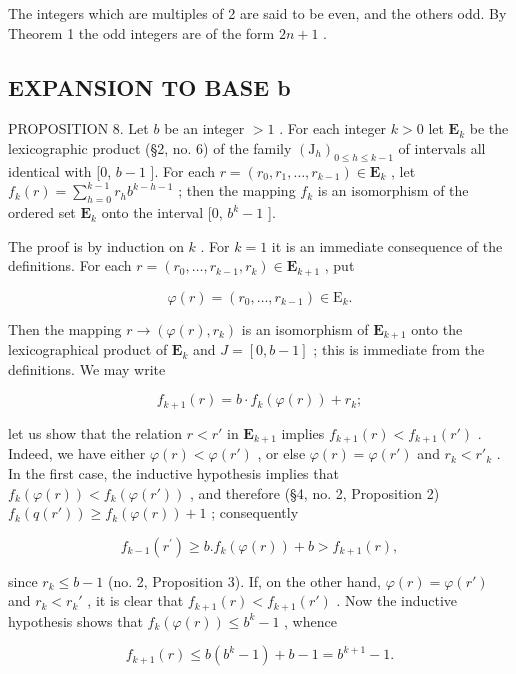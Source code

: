 The integers which are multiples of 2 are said to be even, and the others odd. By Theorem 1 the odd integers are of the form \(2n + 1\) .

\subsection{EXPANSION TO BASE b}

PROPOSITION 8. Let \(b\) be an integer \(> 1\) . For each integer \(k > 0\) let \(\mathbf{E}_k\) be the lexicographic product (§2, no. 6) of the family \((\mathrm{J}_h)_{0 \leqslant h \leqslant k-1}\) of intervals all identical with {[}0, \(b - 1\) {]}. For each \(r = (r_0, r_1, \ldots, r_{k-1}) \in \mathbf{E}_k\) , let \(f_k(r) = \sum_{h=0}^{k-1} r_h b^{k-h-1}\) ; then the mapping \(f_k\) is an isomorphism of the ordered set \(\mathbf{E}_k\) onto the interval {[}0, \(b^k - 1\) {]}.

The proof is by induction on \(k\) . For \(k = 1\) it is an immediate consequence of the definitions. For each \(r = (r_0, \ldots, r_{k-1}, r_k) \in \mathbf{E}_{k+1}\) , put

\[
\varphi (r) = \left(r _ {0}, \dots , r _ {k - 1}\right) \in \mathrm{E} _ {k}.
\]

Then the mapping \(r \to (\varphi(r), r_k)\) is an isomorphism of \(\mathbf{E}_{k+1}\) onto the lexicographical product of \(\mathbf{E}_k\) and \(J = [0, b - 1]\) ; this is immediate from the definitions. We may write

\[
f _ {k + 1} (r) = b \cdot f _ {k} (\varphi (r)) + r _ {k};
\]

let us show that the relation \(r < r'\) in \(\mathbf{E}_{k+1}\) implies \(f_{k+1}(r) < f_{k+1}(r')\) . Indeed, we have either \(\varphi(r) < \varphi(r')\) , or else \(\varphi(r) = \varphi(r')\) and \(r_k < r'_k\) . In the first case, the inductive hypothesis implies that \(f_k(\varphi(r)) < f_k(\varphi(r'))\) , and therefore (§4, no. 2, Proposition 2) \(f_k(q(r')) \geqslant f_k(\varphi(r)) + 1\) ; consequently

\[
f _ {k - 1} (r ^ {\prime}) \geqslant b. f _ {k} (\varphi (r)) + b > f _ {k + 1} (r),
\]

since \(r_k \leqslant b - 1\) (no. 2, Proposition 3). If, on the other hand, \(\varphi(r) = \varphi(r')\) and \(r_k < r_k'\) , it is clear that \(f_{k+1}(r) < f_{k+1}(r')\) . Now the inductive hypothesis shows that \(f_k(\varphi(r)) \leqslant b^k - 1\) , whence

\[
f _ {k + 1} (r) \leqslant b (b ^ {k} - 1) + b - 1 = b ^ {k + 1} - 1.
\]


